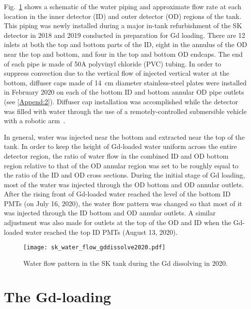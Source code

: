 \documentclass[preprint,12pt]{elsarticle}
\begin{document}
Fig.~\ref{fig:sk_water_flow_dissolving} shows a schematic of the water piping and approximate flow rate at each location in the inner detector (ID) and outer detector (OD) regions of the tank. 
This piping was newly installed during a major in-tank refurbishment of the SK detector in 2018 and 2019 conducted in preparation for Gd loading. There are 12 inlets at both the top and bottom parts of the ID, eight in the annulus of the OD near the top and bottom, and four in the top and bottom OD endcaps. 
The end of each pipe is made of 50A polyvinyl chloride (PVC) tubing.
In order to suppress convection due to the vertical flow of injected vertical water at the bottom, diffuser caps made of 14~cm diameter stainless-steel plates were installed in February 2020 on each of the bottom ID and bottom annular OD pipe outlets (see \ref{Append:2}).  Diffuser cap installation was accomplished while the detector was filled with water through the use of a remotely-controlled submersible vehicle with a robotic arm~\cite{mes}.

In general, water was injected near the bottom and extracted near the top of the tank. 
In order to keep the height of Gd-loaded water uniform across the entire detector region,
the ratio of water flow in the combined ID and OD bottom region relative to that of the OD annular region was set to be roughly equal to the ratio of the ID and OD cross sections.
During the initial stage of Gd loading, most of the  water was injected through the OD bottom and OD annular outlets. After the rising front of Gd-loaded water reached the level of the bottom ID PMTs (on July 16, 2020), the water flow pattern was changed so that most of it was injected through the ID bottom and OD annular outlets.
A similar adjustment was also made for outlets at the top of the OD and ID when the Gd-loaded water reached the top ID PMTs (August 13, 2020).

\begin{figure}[htb]
\centering\texttt{[image: sk\_water\_flow\_gddissolve2020.pdf]}
\caption{Water flow pattern in the SK tank during the Gd dissolving in 2020.}
\label{fig:sk_water_flow_dissolving}
\end{figure}



\section{The Gd-loading}
\label{S:4}
\end{document}
